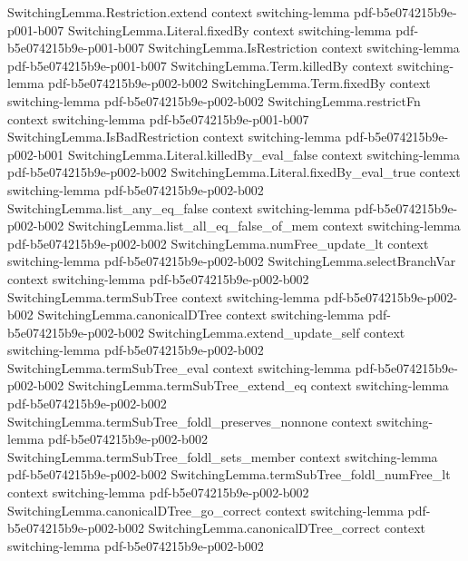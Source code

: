 \begin{lemma}
\proofstep
  {SwitchingLemma.Restriction.extend}
  {context}
  {switching-lemma}
  {pdf-b5e074215b9e-p001-b007}
\proofstep
  {SwitchingLemma.Literal.fixedBy}
  {context}
  {switching-lemma}
  {pdf-b5e074215b9e-p001-b007}
\proofstep
  {SwitchingLemma.IsRestriction}
  {context}
  {switching-lemma}
  {pdf-b5e074215b9e-p001-b007}
\proofstep
  {SwitchingLemma.Term.killedBy}
  {context}
  {switching-lemma}
  {pdf-b5e074215b9e-p002-b002}
\proofstep
  {SwitchingLemma.Term.fixedBy}
  {context}
  {switching-lemma}
  {pdf-b5e074215b9e-p002-b002}
\proofstep
  {SwitchingLemma.restrictFn}
  {context}
  {switching-lemma}
  {pdf-b5e074215b9e-p001-b007}
\proofstep
  {SwitchingLemma.IsBadRestriction}
  {context}
  {switching-lemma}
  {pdf-b5e074215b9e-p002-b001}
\proofstep
  {SwitchingLemma.Literal.killedBy_eval_false}
  {context}
  {switching-lemma}
  {pdf-b5e074215b9e-p002-b002}
\proofstep
  {SwitchingLemma.Literal.fixedBy_eval_true}
  {context}
  {switching-lemma}
  {pdf-b5e074215b9e-p002-b002}
\proofstep
  {SwitchingLemma.list_any_eq_false}
  {context}
  {switching-lemma}
  {pdf-b5e074215b9e-p002-b002}
\proofstep
  {SwitchingLemma.list_all_eq_false_of_mem}
  {context}
  {switching-lemma}
  {pdf-b5e074215b9e-p002-b002}
\proofstep
  {SwitchingLemma.numFree_update_lt}
  {context}
  {switching-lemma}
  {pdf-b5e074215b9e-p002-b002}
\proofstep
  {SwitchingLemma.selectBranchVar}
  {context}
  {switching-lemma}
  {pdf-b5e074215b9e-p002-b002}
\proofstep
  {SwitchingLemma.termSubTree}
  {context}
  {switching-lemma}
  {pdf-b5e074215b9e-p002-b002}
\proofstep
  {SwitchingLemma.canonicalDTree}
  {context}
  {switching-lemma}
  {pdf-b5e074215b9e-p002-b002}
\proofstep
  {SwitchingLemma.extend_update_self}
  {context}
  {switching-lemma}
  {pdf-b5e074215b9e-p002-b002}
\proofstep
  {SwitchingLemma.termSubTree_eval}
  {context}
  {switching-lemma}
  {pdf-b5e074215b9e-p002-b002}
\proofstep
  {SwitchingLemma.termSubTree_extend_eq}
  {context}
  {switching-lemma}
  {pdf-b5e074215b9e-p002-b002}
\proofstep
  {SwitchingLemma.termSubTree_foldl_preserves_nonnone}
  {context}
  {switching-lemma}
  {pdf-b5e074215b9e-p002-b002}
\proofstep
  {SwitchingLemma.termSubTree_foldl_sets_member}
  {context}
  {switching-lemma}
  {pdf-b5e074215b9e-p002-b002}
\proofstep
  {SwitchingLemma.termSubTree_foldl_numFree_lt}
  {context}
  {switching-lemma}
  {pdf-b5e074215b9e-p002-b002}
\proofstep
  {SwitchingLemma.canonicalDTree_go_correct}
  {context}
  {switching-lemma}
  {pdf-b5e074215b9e-p002-b002}
\proofstep
  {SwitchingLemma.canonicalDTree_correct}
  {context}
  {switching-lemma}
  {pdf-b5e074215b9e-p002-b002}

\end{lemma}
